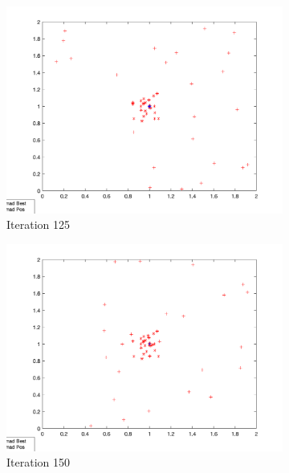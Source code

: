 \begin{figure}
\begin{subfigure}[b]{0.4\textwidth}
    \includegraphics[width=\textwidth]{img/roam/roam-iter-125}
    \caption{Iteration 125}
    \label{fig:roam-iter-4}
  \end{subfigure}
  \begin{subfigure}[b]{0.4\textwidth}
    \includegraphics[width=\textwidth]{img/roam/roam-iter-150}
    \caption{Iteration 150}
    \label{fig:roam-iter-5}
  \end{subfigure}
  \begin{subfigure}[b]{0.4\textwidth}

\end{subfigure}
\end{figure}
